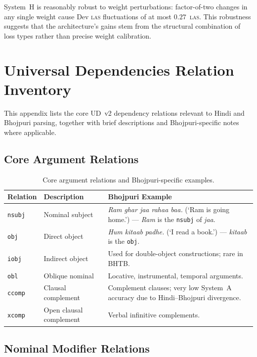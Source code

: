 \documentclass[12pt,a4paper,oneside]{report}
\newcommand{\las}{\textsc{las}}
\begin{document}
System~H is reasonably robust to weight perturbations: factor-of-two changes
in any single weight cause Dev \las{} fluctuations of at most $0.27$~\las{}.
This robustness suggests that the architecture's gains stem from the structural
combination of loss types rather than precise weight calibration.


\chapter{Universal Dependencies Relation Inventory}
\label{app:ud_relations}

This appendix lists the core UD~v2 dependency relations relevant to Hindi and
Bhojpuri parsing, together with brief descriptions and Bhojpuri-specific notes
where applicable.

\section{Core Argument Relations}

\begin{table}[ht]
\centering
\caption{Core argument relations and Bhojpuri-specific examples.}
\label{tab:ud_core}
\begin{tabular}{@{}p{1.8cm}p{4.0cm}p{7.5cm}@{}}
\toprule
\textbf{Relation} & \textbf{Description} & \textbf{Bhojpuri Example} \\
\midrule
\texttt{nsubj}    & Nominal subject               & \emph{Ram} \emph{ghar jaa rahaa baa.} (`Ram is going home.') --- \emph{Ram} is the \texttt{nsubj} of \emph{jaa}. \\
\texttt{obj}      & Direct object                 & \emph{Hum kitaab} \emph{padhe.} (`I read a book.') --- \emph{kitaab} is the \texttt{obj}. \\
\texttt{iobj}     & Indirect object               & Used for double-object constructions; rare in BHTB. \\
\texttt{obl}      & Oblique nominal               & Locative, instrumental, temporal arguments. \\
\texttt{ccomp}    & Clausal complement            & Complement clauses; very low System~A accuracy due to Hindi--Bhojpuri divergence. \\
\texttt{xcomp}    & Open clausal complement       & Verbal infinitive complements. \\
\bottomrule
\end{tabular}
\end{table}

\section{Nominal Modifier Relations}
\end{document}

